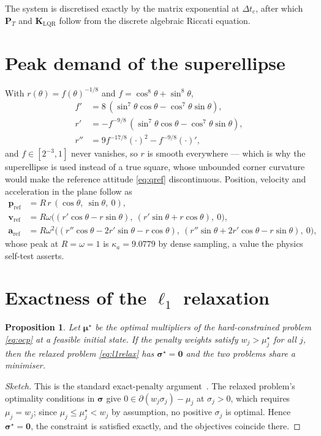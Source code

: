 \documentclass[11pt,a4paper,twoside,openright]{report}
\renewcommand{\vec}[1]{\bm{#1}}
\newcommand{\mat}[1]{\bm{#1}}
\newcommand{\refsym}{\mathrm{ref}}
\theoremstyle{plain}
\newtheorem{proposition}[theorem]{Proposition}
\theoremstyle{definition}
\theoremstyle{remark}
\begin{document}
	The system is discretised exactly by the matrix exponential at $\Delta t_c$,
	after which $\mat P_T$ and $\mat K_\mathrm{LQR}$ follow from the discrete
	algebraic Riccati equation.

	\section{Peak demand of the superellipse}

	With $r(\theta)=f(\theta)^{-1/8}$ and $f=\cos^8\theta+\sin^8\theta$,
	\begin{align}
		f' &= 8\,(\sin^7\theta\cos\theta-\cos^7\theta\sin\theta),\\
		r' &= -f^{-9/8}\,(\sin^7\theta\cos\theta-\cos^7\theta\sin\theta),\\
		r'' &= 9f^{-17/8}(\cdot)^2-f^{-9/8}(\cdot)',
	\end{align}
	and $f\in[2^{-3},1]$ never vanishes, so $r$ is smooth everywhere --- which is why
	the superellipse is used instead of a true square, whose unbounded corner
	curvature would make the reference attitude \cref{eq:qref} discontinuous.
	Position, velocity and acceleration in the plane follow as
	\begin{align}
		\vec p_\refsym &= R\,r\,(\cos\theta,\ \sin\theta,\ 0),\\
		\vec v_\refsym &= R\omega\big((r'\cos\theta-r\sin\theta),\ (r'\sin\theta+r\cos\theta),\ 0\big),\\
		\vec a_\refsym &= R\omega^2\big((r''\cos\theta-2r'\sin\theta-r\cos\theta),\
		(r''\sin\theta+2r'\cos\theta-r\sin\theta),\ 0\big),
	\end{align}
	whose peak at $R=\omega=1$ is $\kappa_a=\num{9.0779}$ by dense sampling, a value
	the physics self-test asserts.

	\section{Exactness of the \texorpdfstring{$\ell_1$}{l1} relaxation}

	\begin{proposition}
		Let $\vec\mu^\star$ be the optimal multipliers of the hard-constrained problem
		\cref{eq:ocp} at a feasible initial state. If the penalty weights satisfy
		$w_j>\mu_j^\star$ for all $j$, then the relaxed problem \cref{eq:l1relax} has
		$\vec\sigma^\star=\vec 0$ and the two problems share a minimiser.
	\end{proposition}

	\begin{proof}[Sketch]
		This is the standard exact-penalty argument~\cite{scokaert1999feasibility}.
		The relaxed problem's optimality conditions in $\vec\sigma$ give
		$0\in\partial(w_j\sigma_j)-\mu_j$ at $\sigma_j>0$, which requires
		$\mu_j=w_j$; since $\mu_j\le\mu_j^\star<w_j$ by assumption, no positive
		$\sigma_j$ is optimal. Hence $\vec\sigma^\star=\vec 0$, the constraint is
		satisfied exactly, and the objectives coincide there.
	\end{proof}
\end{document}
